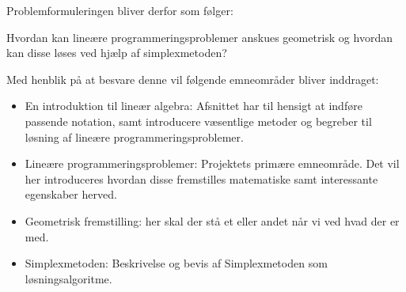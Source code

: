 Problemformuleringen bliver derfor som følger:
\begin{col}{}{}
Hvordan kan lineære programmeringsproblemer anskues geometrisk og hvordan kan disse løses ved hjælp af simplexmetoden?
\end{col}
Med henblik på at besvare denne vil følgende emneområder bliver inddraget:
\begin{itemize}
\item En introduktion til lineær algebra: Afsnittet har til hensigt at indføre passende notation, samt introducere væsentlige metoder og begreber til løsning af lineære programmeringsproblemer.
\item Lineære programmeringsproblemer: Projektets primære emneområde. Det vil her introduceres hvordan disse fremstilles matematiske samt interessante egenskaber herved.
\item Geometrisk fremstilling: her skal der stå et eller andet når vi ved hvad der er med.
\item Simplexmetoden: Beskrivelse og bevis af Simplexmetoden som løsningsalgoritme.
\end{itemize}